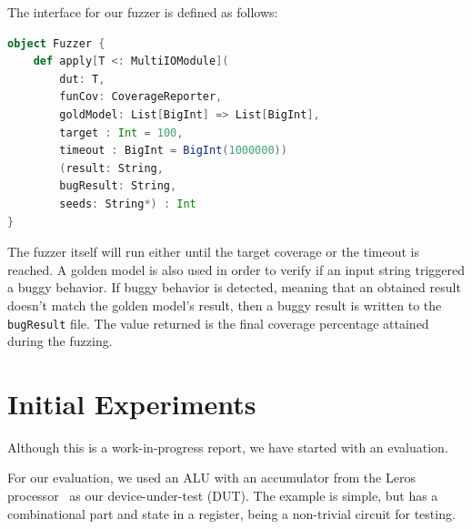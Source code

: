 \documentclass[conference]{IEEEtran}
\newcommand{\martin}[1]{{\color{blue} Martin: #1}}
\begin{document}
The interface for our fuzzer is defined as follows:
\begin{lstlisting}[captionpos=b,caption={Interface for the ChiselVerify fuzzer. It takes as parameter a \texttt{dut}, \texttt{chiselverify.coverage.CoverageReporter}, which is the verification plan used to define the functional coverage that will drive the fuzzing, and a golden model, which is used to find buggy results. It also takes in a target coverage percentage between 0 and 100, which defaults to 100, and a timeout which is set by default to 1'000'000. The second set of parameters are a result output file name, where all of the interesting tests and their resulting hit values will be written, a bug output file name, as well as a variable number of file paths, which will be used as seeds for the mutation engine. },label={lst:dutexample},language=scala]
object Fuzzer {
    def apply[T <: MultiIOModule](
        dut: T, 
        funCov: CoverageReporter, 
        goldModel: List[BigInt] => List[BigInt],
        target : Int = 100,
        timeout : BigInt = BigInt(1000000))
        (result: String,
        bugResult: String,
        seeds: String*) : Int
}
\end{lstlisting}
The fuzzer itself will run either until the target coverage or the timeout is reached. 
A golden model is also used in order to verify if an input string triggered a buggy behavior.
If buggy behavior is detected, meaning that an obtained result doesn't match the golden model's result, then a buggy result is written to the \texttt{bugResult} file.
The value returned is the final coverage percentage attained during the fuzzing.

\section{Initial Experiments}
\label{sec:eval}
%

Although this is a work-in-progress report, we have started with an evaluation.

For our evaluation, we used an ALU with an accumulator from the Leros processor~\cite{leros:arcs2019}
as our device-under-test (DUT).
The example is simple, but has a combinational part and state in a register, being
a non-trivial circuit for testing.
\end{document}
